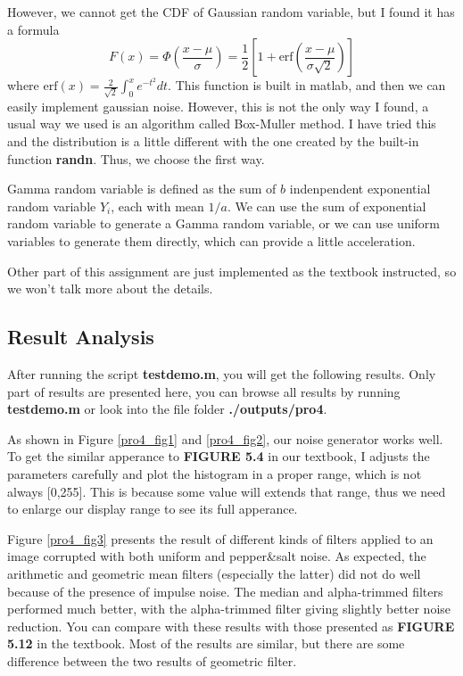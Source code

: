 \documentclass[11pt,a4paper]{article}
\begin{document}
However, we cannot get the CDF of Gaussian random variable, but I found it has a formula
\begin{equation}
	F(x)=\Phi (\frac{x-\mu}{\sigma})=\frac{1}{2}\left[1+\textrm{erf}\left(\frac{x-\mu}{\sigma\sqrt{2}}\right)\right]
\end{equation}
where $\textrm{erf}(x)=\frac{2}{\sqrt{2}}\int_{0}^{x} e^{-t^2} dt$. This function is 
built in matlab, and then we can easily implement gaussian noise.
However, this is not the only way I found, a usual way we used is 
an algorithm called Box-Muller method. I have tried this and the distribution
is a little different with the one created by the built-in function \textbf{randn}.
Thus, we choose the first way.

Gamma random variable is defined as the sum of $b$ indenpendent exponential random
variable $Y_i$, each with mean $1/a$. We can use the sum of exponential random variable
to generate a Gamma random variable, or we can use uniform variables to generate them directly, 
which can provide a little acceleration.

Other part of this assignment are just implemented as the textbook instructed, so we won't talk more about
the details.

\subsection{Result Analysis}

After running the script \textbf{testdemo.m}, you will get the following results.
Only part of 
results are presented here, you can browse all results by running \textbf{testdemo.m} or
look into the file folder \textbf{./outputs/pro4}.

As shown in Figure \ref{pro4_fig1} and \ref{pro4_fig2}, our noise generator works well.
To get the similar apperance to \textbf{FIGURE 5.4} in our textbook, I adjusts the parameters
carefully and plot the histogram in a proper range, which is not always [0,255]. This is because
some value will extends that range, thus we need to enlarge our display range to see
its full apperance.

Figure \ref{pro4_fig3} presents the result of different kinds of filters applied to
an image corrupted with both uniform and pepper\&salt noise. As expected,
the arithmetic and geometric mean filters (especially the latter) did not do
well because of the presence of impulse noise. The median and alpha-trimmed
filters performed much better, with the alpha-trimmed filter giving slightly better
noise reduction. You can compare with these results with those presented as
\textbf{FIGURE 5.12} in the textbook. Most of the results are similar, but there are 
some difference between the two results of geometric filter.
\end{document}
